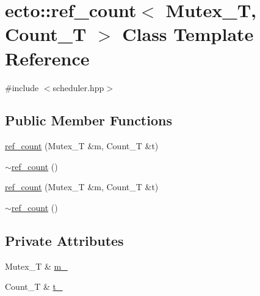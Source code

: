 \hypertarget{classecto_1_1ref__count}{\section{ecto\-:\-:ref\-\_\-count$<$ Mutex\-\_\-\-T, Count\-\_\-\-T $>$ Class Template Reference}
\label{classecto_1_1ref__count}
}


{\ttfamily \#include $<$scheduler.\-hpp$>$}

\subsection*{Public Member Functions}
\begin{DoxyCompactItemize}
\item 
\hyperlink{classecto_1_1ref__count_a39fc7e105b142b7444a90dc6a3796828}{ref\-\_\-count} (Mutex\-\_\-\-T \&m, Count\-\_\-\-T \&t)
\item 
\hyperlink{classecto_1_1ref__count_a22b67e2d381344ff4c9b4c453bb47e23}{$\sim$ref\-\_\-count} ()
\item 
\hyperlink{classecto_1_1ref__count_a39fc7e105b142b7444a90dc6a3796828}{ref\-\_\-count} (Mutex\-\_\-\-T \&m, Count\-\_\-\-T \&t)
\item 
\hyperlink{classecto_1_1ref__count_a22b67e2d381344ff4c9b4c453bb47e23}{$\sim$ref\-\_\-count} ()
\end{DoxyCompactItemize}
\subsection*{Private Attributes}
\begin{DoxyCompactItemize}
\item 
Mutex\-\_\-\-T \& \hyperlink{classecto_1_1ref__count_a983fe76ebfb0351182fc31968bcbafd4}{m\-\_\-}
\item 
Count\-\_\-\-T \& \hyperlink{classecto_1_1ref__count_a156a5db53cf932f5dfe68b83bf3aca24}{t\-\_\-}
\end{DoxyCompactItemize}


